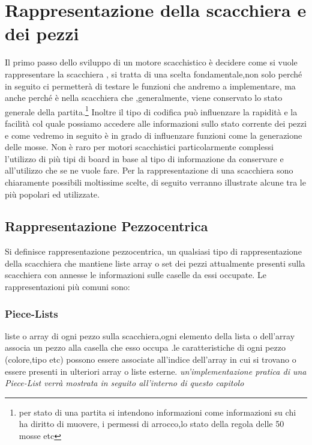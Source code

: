 \section{Rappresentazione della scacchiera e dei pezzi} %
Il primo passo dello sviluppo di un motore scacchistico è decidere come si vuole rappresentare
la scacchiera , si tratta di una scelta fondamentale,non solo perché in seguito ci permetterà
di testare le funzioni che andremo a implementare, ma anche perché è nella scacchiera che ,generalmente,
viene conservato lo stato generale della partita.\footnote{per stato di una partita si intendono informazioni come
    informazioni su chi ha diritto di muovere, i permessi di arrocco,lo stato della regola delle 50 mosse etc}
Inoltre il tipo di codifica può influenzare la rapidità
e la facilità col quale possiamo accedere alle informazioni sullo stato corrente dei pezzi
e come vedremo in seguito è in grado di influenzare funzioni come la generazione delle mosse.
Non è raro per motori scacchistici particolarmente complessi l'utilizzo di più tipi di board in base
al tipo di informazione da conservare e all'utilizzo che se ne vuole fare.
Per la rappresentazione di una scacchiera sono chiaramente possibili moltissime scelte, di seguito
verranno illustrate alcune tra le più popolari ed utilizzate.

\subsection{Rappresentazione Pezzocentrica}
Si definisce rappresentazione pezzocentrica, un qualsiasi tipo di rappresentazione della scacchiera che mantiene liste
array o set dei pezzi attualmente presenti sulla scacchiera con annesse le informazioni sulle caselle da essi occupate.
Le rappresentazioni più comuni sono:
\subsubsection{Piece-Lists}
liste o array di ogni pezzo sulla scacchiera,ogni elemento della lista o dell'array associa un pezzo
alla casella che esso occupa .le caratteristiche di ogni pezzo (colore,tipo etc)
possono essere associate all'indice dell'array in cui si trovano o essere presenti in ulteriori array
o liste esterne. \emph{un'implementazione pratica di una Piece-List verrà mostrata in seguito all'interno
    di questo capitolo}


